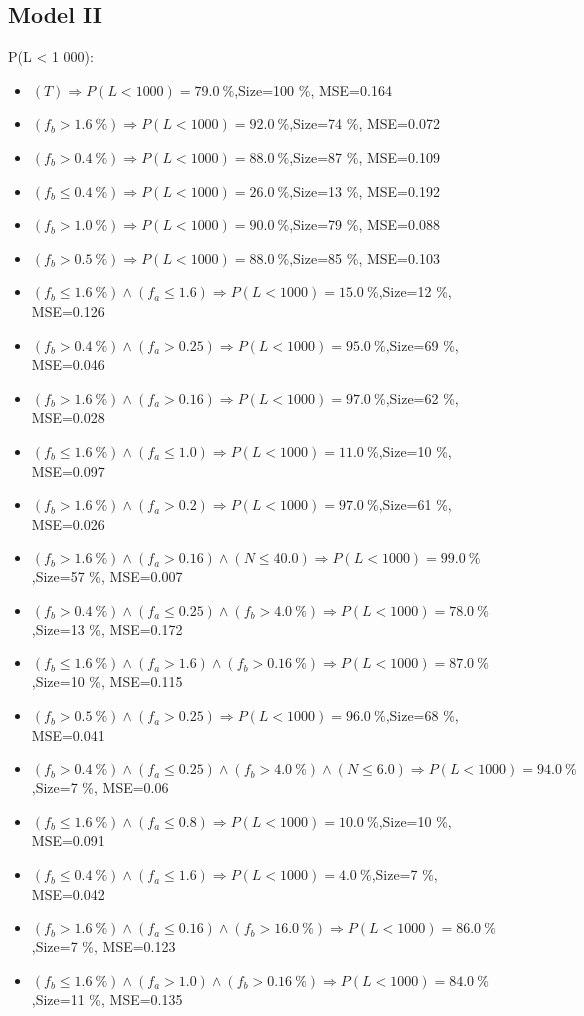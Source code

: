 \documentclass[numbered]{CSL}
\begin{document}
\subsection{Model II}
P(L < 1 000):
\begin{itemize}
\item $(T) \Rightarrow P(L < 1 000) = 79.0~\%$,\hfill Size=100 \%, MSE=0.164
\item $(f_b > 1.6~\%) \Rightarrow P(L < 1 000) = 92.0~\%$,\hfill Size=74 \%, MSE=0.072
\item $(f_b > 0.4~\%) \Rightarrow P(L < 1 000) = 88.0~\%$,\hfill Size=87 \%, MSE=0.109
\item $(f_b \leq 0.4~\%) \Rightarrow P(L < 1 000) = 26.0~\%$,\hfill Size=13 \%, MSE=0.192
\item $(f_b > 1.0~\%) \Rightarrow P(L < 1 000) = 90.0~\%$,\hfill Size=79 \%, MSE=0.088
\item $(f_b > 0.5~\%) \Rightarrow P(L < 1 000) = 88.0~\%$,\hfill Size=85 \%, MSE=0.103
\item $(f_b \leq 1.6~\%) \land (f_a \leq 1.6) \Rightarrow P(L < 1 000) = 15.0~\%$,\hfill Size=12 \%, MSE=0.126
\item $(f_b > 0.4~\%) \land (f_a > 0.25) \Rightarrow P(L < 1 000) = 95.0~\%$,\hfill Size=69 \%, MSE=0.046
\item $(f_b > 1.6~\%) \land (f_a > 0.16) \Rightarrow P(L < 1 000) = 97.0~\%$,\hfill Size=62 \%, MSE=0.028
\item $(f_b \leq 1.6~\%) \land (f_a \leq 1.0) \Rightarrow P(L < 1 000) = 11.0~\%$,\hfill Size=10 \%, MSE=0.097
\item $(f_b > 1.6~\%) \land (f_a > 0.2) \Rightarrow P(L < 1 000) = 97.0~\%$,\hfill Size=61 \%, MSE=0.026
\item $(f_b > 1.6~\%) \land (f_a > 0.16) \land (N \leq 40.0) \Rightarrow P(L < 1 000) = 99.0~\%$,\hfill Size=57 \%, MSE=0.007
\item $(f_b > 0.4~\%) \land (f_a \leq 0.25) \land (f_b > 4.0~\%) \Rightarrow P(L < 1 000) = 78.0~\%$,\hfill Size=13 \%, MSE=0.172
\item $(f_b \leq 1.6~\%) \land (f_a > 1.6) \land (f_b > 0.16~\%) \Rightarrow P(L < 1 000) = 87.0~\%$,\hfill Size=10 \%, MSE=0.115
\item $(f_b > 0.5~\%) \land (f_a > 0.25) \Rightarrow P(L < 1 000) = 96.0~\%$,\hfill Size=68 \%, MSE=0.041
\item $(f_b > 0.4~\%) \land (f_a \leq 0.25) \land (f_b > 4.0~\%) \land (N \leq 6.0) \Rightarrow P(L < 1 000) = 94.0~\%$,\hfill Size=7 \%, MSE=0.06
\item $(f_b \leq 1.6~\%) \land (f_a \leq 0.8) \Rightarrow P(L < 1 000) = 10.0~\%$,\hfill Size=10 \%, MSE=0.091
\item $(f_b \leq 0.4~\%) \land (f_a \leq 1.6) \Rightarrow P(L < 1 000) = 4.0~\%$,\hfill Size=7 \%, MSE=0.042
\item $(f_b > 1.6~\%) \land (f_a \leq 0.16) \land (f_b > 16.0~\%) \Rightarrow P(L < 1 000) = 86.0~\%$,\hfill Size=7 \%, MSE=0.123
\item $(f_b \leq 1.6~\%) \land (f_a > 1.0) \land (f_b > 0.16~\%) \Rightarrow P(L < 1 000) = 84.0~\%$,\hfill Size=11 \%, MSE=0.135
\end{itemize}
\end{document}
